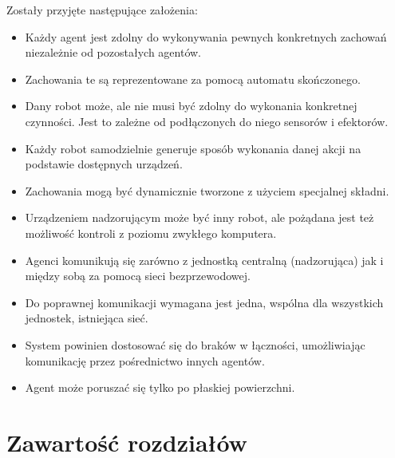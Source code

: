 Zostały przyjęte następujące założenia:
\begin{itemize}
  \item Każdy agent jest zdolny do wykonywania pewnych konkretnych zachowań niezależnie od pozostałych agentów.
  \item Zachowania te są reprezentowane za pomocą automatu skończonego.
  \item Dany robot może, ale nie musi być zdolny do wykonania konkretnej czynności. Jest to zależne od podłączonych do niego sensorów i efektorów.
  \item Każdy robot samodzielnie generuje sposób wykonania danej akcji na podstawie dostępnych urządzeń.
  \item Zachowania mogą być dynamicznie tworzone z użyciem specjalnej składni.
  \item Urządzeniem nadzorującym może być inny robot, ale pożądana jest też możliwość kontroli z poziomu zwykłego komputera.
  \item Agenci komunikują się zarówno z jednostką centralną (nadzorująca) jak i między sobą za pomocą sieci bezprzewodowej.
  \item Do poprawnej komunikacji wymagana jest jedna, wspólna dla wszystkich jednostek, istniejąca sieć.
  \item System powinien dostosować się do braków w łączności, umożliwiając komunikację przez pośrednictwo innych agentów.
  \item Agent może poruszać się tylko po płaskiej powierzchni.
\end{itemize}

%

\section{Zawartość rozdziałów}

